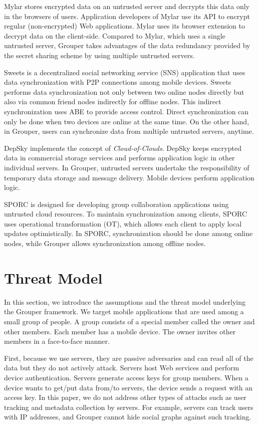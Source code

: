 \documentclass[sigconf]{acmart}
\begin{document}
Mylar\cite{popa2014building} stores encrypted data on an untrusted server and decrypts this data only in the browsers of users. 
Application developers of Mylar use its API to encrypt regular (non-encrypted) Web applications. 
Mylar uses its browser extension to decrypt data on the client-side. 
Compared to Mylar, which uses a single untrusted server, Grouper takes advantages of the data redundancy provided by the secret sharing scheme by using multiple untrusted servers.

Sweets\cite{sweets} is a decentralized social networking service (SNS) application that uses data synchronization with P2P connections among mobile devices. 
Sweets performs data synchronization not only between two online nodes directly but also via common friend nodes indirectly for offline nodes.
This indirect synchronization uses ABE to provide access control.
Direct synchronization can only be done when two devices are online at the same time. 
On the other hand, in Grouper, users can synchronize data from multiple untrusted servers, anytime.

DepSky\cite{bessani2013depsky} implements the concept of \emph{Cloud-of-Clouds}.  
DepSky keeps encrypted data in commercial storage services and performs application logic in other individual servers.
In Grouper, untrusted servers undertake the responsibility of temporary data storage and message delivery.
Mobile devices perform application logic.

SPORC\cite{feldman2010sporc} is designed for developing group collaboration applications using untrusted cloud resources.
To maintain synchronization among clients, SPORC uses operational transformation (OT), which allows each client to apply local updates optimistically.
In SPORC, synchronization should be done among online nodes, while Grouper allows synchronization among offline nodes.

\section{Threat Model}

In this section, we introduce the assumptions and the threat model underlying the Grouper framework.
We target mobile applications that are used among a small group of people.
A group consists of a special member called the owner and other members.
Each member has a mobile device.
The owner invites other members in a face-to-face manner.

First, because we use servers, they are passive adversaries and can read all of the data but they do not actively attack.
Servers host Web services and perform device authentication.
Servers generate access keys for group members. 
When a device wants to get/put data from/to servers, the device sends a request with an access key.
In this paper, we do not address other types of attacks such as user tracking and metadata collection by servers. 
For example, servers can track users with IP addresses, and Grouper cannot hide social graphs against such tracking.
\end{document}
